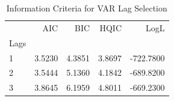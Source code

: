 \begin{table}
\caption{Information Criteria for VAR Lag Selection}
\label{tab:lag_selection}
\begin{tabular}{lrrrr}
\toprule
 & AIC & BIC & HQIC & LogL \\
Lags &  &  &  &  \\
\midrule
1 & 3.5230 & 4.3851 & 3.8697 & -722.7800 \\
2 & 3.5444 & 5.1360 & 4.1842 & -689.8200 \\
3 & 3.8645 & 6.1959 & 4.8011 & -669.2300 \\
\bottomrule
\end{tabular}
\end{table}
